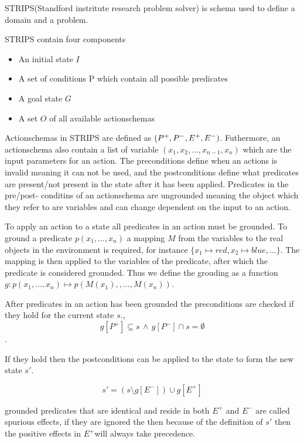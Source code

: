 \documentclass[master.tex]{subfiles}
\begin{document}
STRIPS(Standford instritute research problem solver) is schema used
to define a domain and a problem.

STRIPS contain four components

\begin{itemize}
    \item An initial state $I$
    \item A set of conditions P which contain all possible predicates
    \item A goal state $G$
    \item A set $O$ of all available actionschemas
\end{itemize}

Actionschemas in STRIPS are defined as $\text{\ensuremath{\left(P^{+},P^{-},E^{+},E^{-}\right)}}$.
Futhermore, an actionschema also contain a list of variable $(x_{1},x_{2},\dots,x_{n-1},x_{n})$
which are the input parameters for an action. The preconditions define
when an actions is invalid meaning it can not be used, and the postconditions
define what predicates are present/not present in the state after
it has been applied. Predicates in the pre/post- conditins of an actionschema
are ungrounded meaning the object which they refer to are variables
and can change dependent on the input to an action.

To apply an action to a state all predicates in an action must be
grounded. To ground a predicate $p(x_{1},\dots,x_{n})$ a mapping
$M$ from the variables to the real objects in the environment is
required, for instance $\{x_{1}\mapsto red,x_{2}\mapsto blue, \dots\}$.
The mapping is then applied to the variables of the predicate, after
which the predicate is considered grounded. Thus we define the grouding
as a function $g:p(x_{1},\dots,x_{n})\mapsto p\left(M\left(x_{1}\right),,\dots,M\left(x_{n}\right)\right)$.

After predicates in an action has been grounded the preconditions
are checked if they hold for the current state $s$., \\
\[
g\left[P^{+}\right]\subseteq s\,\land\, g\left[P^{-}\right]\cap s=\emptyset
\]
.

If they hold then the postconditions can be applied to the state to
form the new state $s'$.

\[
s'=\left(s\setminus g\left[E^{-}\right]\right)\cup g\left[E^{+}\right]
\]


grounded predicates that are identical and reside in both $E^{+}$
and $E^{-}$ are called spurious effects, if they are ignored the
then because of the definition of $s'$ then the positive effects
in $E^{+}$will always take precedence.
\end{document}
